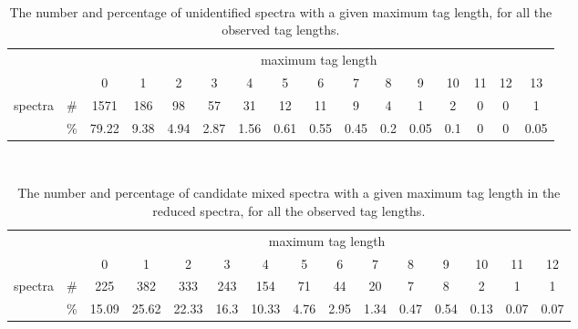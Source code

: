 \documentclass{article}
\begin{document}
\begin{table}[h]
\vspace{3mm}\
{\centering
\begin{center}
\begin{tabular}{|c|c|
c|c|c|c|c|c|c|c|c|c|c|c|c|c|}
  \hline
  \multicolumn{2}{|c|}{} & \multicolumn{ 14}{|c|}{maximum tag length} \\
  \cline{3-16}
  \multicolumn{2}{|c|}{} 
 & 0 & 1 & 2 & 3 & 4 & 5 & 6 & 7 & 8 & 9 & 10 & 11 & 12 & 13\\
  \hline
  \multirow{2}{*}{spectra} & \#
 & 1571 & 186 & 98 & 57 & 31 & 12 & 11 & 9 & 4 & 1 & 2 & 0 & 0 & 1\\
   & \%
 & 79.22 & 9.38 & 4.94 & 2.87 & 1.56 & 0.61 & 0.55 & 0.45 & 0.2 & 0.05 & 0.1 & 0 & 0 & 0.05\\
  \hline
\end{tabular}
\end{center}
\par}
\centering
\caption{The number and percentage of unidentified spectra with a given maximum tag length, for all the observed tag lengths.}
\vspace{3mm}
\label{table:unident-tags}
\end{table}
\begin{table}[h]
\vspace{3mm}\
{\centering
\begin{center}
\begin{tabular}{|c|c|
c|c|c|c|c|c|c|c|c|c|c|c|c|}
  \hline
  \multicolumn{2}{|c|}{} & \multicolumn{ 13}{|c|}{maximum tag length} \\
  \cline{3-15}
  \multicolumn{2}{|c|}{} 
 & 0 & 1 & 2 & 3 & 4 & 5 & 6 & 7 & 8 & 9 & 10 & 11 & 12\\
  \hline
  \multirow{2}{*}{spectra} & \#
 & 225 & 382 & 333 & 243 & 154 & 71 & 44 & 20 & 7 & 8 & 2 & 1 & 1\\
   & \%
 & 15.09 & 25.62 & 22.33 & 16.3 & 10.33 & 4.76 & 2.95 & 1.34 & 0.47 & 0.54 & 0.13 & 0.07 & 0.07\\
  \hline
\end{tabular}
\end{center}
\par}
\centering
\caption{The number and percentage of candidate mixed spectra with a given maximum tag length in the reduced spectra, for all the observed tag lengths.}
\vspace{3mm}
\label{table:mixed-tags}
\end{table}
\end{document}
